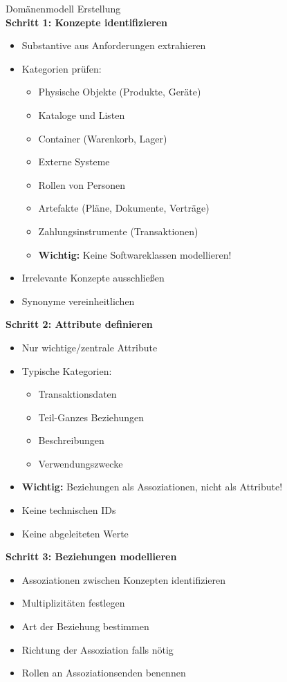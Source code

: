 \begin{KR}{Domänenmodell Erstellung}\\
\textbf{Schritt 1: Konzepte identifizieren}
\begin{itemize}
    \item Substantive aus Anforderungen extrahieren
    \item Kategorien prüfen:
    \begin{itemize}
        \item Physische Objekte (Produkte, Geräte)
        \item Kataloge und Listen
        \item Container (Warenkorb, Lager)
        \item Externe Systeme
        \item Rollen von Personen
        \item Artefakte (Pläne, Dokumente, Verträge)
        \item Zahlungsinstrumente (Transaktionen)
        \item \textbf{Wichtig:} Keine Softwareklassen modellieren!
    \end{itemize}
    \item Irrelevante Konzepte ausschließen
    \item Synonyme vereinheitlichen
\end{itemize}

\textbf{Schritt 2: Attribute definieren}
\begin{itemize}
    \item Nur wichtige/zentrale Attribute
    \item Typische Kategorien:
    \begin{itemize}
        \item Transaktionsdaten
        \item Teil-Ganzes Beziehungen
        \item Beschreibungen
        \item Verwendungszwecke
    \end{itemize}
    \item \textbf{Wichtig:} Beziehungen als Assoziationen, nicht als Attribute!
    \item Keine technischen IDs
    \item Keine abgeleiteten Werte
\end{itemize}

\textbf{Schritt 3: Beziehungen modellieren}
\begin{itemize}
    \item Assoziationen zwischen Konzepten identifizieren
    \item Multiplizitäten festlegen
    \item Art der Beziehung bestimmen
    \item Richtung der Assoziation falls nötig
    \item Rollen an Assoziationsenden benennen
\end{itemize}
\end{KR}


